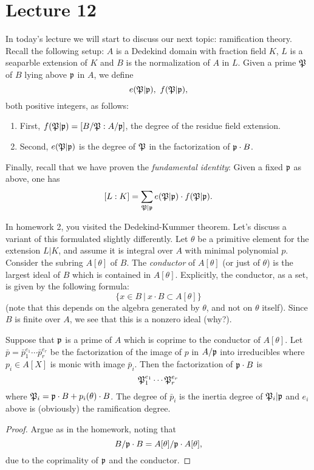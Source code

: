 \section{Lecture 12}

In today's lecture we will start to discuss our next topic: ramification theory.
Recall the following setup: $A$ is a Dedekind domain with fraction field $K$, $L$ is a seaparble extension of $K$ and $B$ is the normalization of $A$ in $L$.
Given a prime $\mathfrak{P}$ of $B$ lying above $\mathfrak{p}$ in $A$, we define
\[ e(\Pfrak|\pfrak), \ f(\Pfrak|\pfrak), \]
both positive integers, as follows:
\begin{enumerate}
  \item First, $f(\mathfrak{P}|\mathfrak{p}) = [B/\mathfrak{P} : A/\mathfrak{p}]$, the degree of the residue field extension.
  \item Second, $e(\mathfrak{P}|\mathfrak{p})$ is the degree of $\mathfrak{P}$ in the factorization of $\mathfrak{p} \cdot B$.
\end{enumerate}
Finally, recall that we have proven the \emph{fundamental identity}: Given a fixed $\mathfrak{p}$ as above, one has
\[ [L:K] = \sum_{\mathfrak{P}|\mathfrak{p}} e(\mathfrak{P}|\mathfrak{p}) \cdot f(\mathfrak{P}|\mathfrak{p}). \]

In homework 2, you visited the Dedekind-Kummer theorem.
Let's discuss a variant of this formulated slightly differently.
Let $\theta$ be a primitive element for the extension $L|K$, and assume it is integral over $A$ with minimal polynomial $p$.
Consider the subring $A[\theta]$ of $B$.
The \emph{conductor} of $A[\theta]$ (or just of $\theta$) is the largest ideal of $B$ which is contained in $A[\theta]$.
Explicitly, the conductor, as a set, is given by the following formula:
\[ \{ x \in B \ | \ x \cdot B \subset A[\theta] \} \]
(note that this depends on the algebra generated by $\theta$, and not on $\theta$ itself).
Since $B$ is finite over $A$, we see that this is a nonzero ideal (why?).

\begin{proposition}
  Suppose that $\mathfrak{p}$ is a prime of $A$ which is coprime to the conductor of $A[\theta]$.
  Let $\bar p = \bar p_{1}^{e_{1}} \cdots \bar p_{r}^{e_{r}}$ be the factorization of the image of $p$ in $A/\mathfrak{p}$ into irreducibles where $p_{i} \in A[X]$ is monic with image $\bar p_{i}$.
  Then the factorization of $\mathfrak{p} \cdot B$ is
  \[ \mathfrak{P}_{1}^{e_{1}} \cdots \mathfrak{P}_{r}^{e_{r}} \]
  where $\mathfrak{P}_{i} = \mathfrak{p} \cdot B + p_{i}(\theta) \cdot B$.
  The degree of $\bar p_{i}$ is the inertia degree of $\mathfrak{P}_{i}|\mathfrak{p}$ and $e_{i}$ above is (obviously) the ramification degree.
\end{proposition}
\begin{proof}
  Argue as in the homework, noting that
  \[ B/\mathfrak{p} \cdot B = A[\theta]/\mathfrak{p} \cdot A[\theta], \]
  due to the coprimality of $\mathfrak{p}$ and the conductor.
\end{proof}

